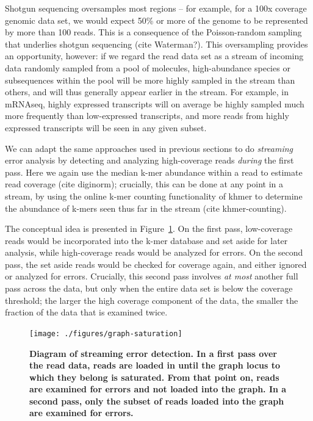 \documentclass{article}
\begin{document}
Shotgun sequencing oversamples most regions -- for example, for a 100x
coverage genomic data set, we would expect 50\% or more of the genome
to be represented by more than 100 reads.  This is a consequence of
the Poisson-random sampling that underlies shotgun sequencing (cite
Waterman?).  This oversampling provides an opportunity, however: if we
regard the read data set as a stream of incoming data randomly sampled
from a pool of molecules, high-abundance species or subsequences
within the pool will be more highly sampled in the stream than others,
and will thus generally appear earlier in the stream.  For example, in
mRNAseq, highly expressed transcripts will on average be highly
sampled much more frequently than low-expressed transcripts, and more
reads from highly expressed transcripts will be seen in any given
subset.

We can adapt the same approaches used in previous sections to do {\em
  streaming} error analysis by detecting and analyzing high-coverage
reads {\em during} the first pass.  Here we again use the median k-mer
abundance within a read to estimate read coverage (cite diginorm);
crucially, this can be done at any point in a stream, by using the
online k-mer counting functionality of khmer to determine the
abundance of k-mers seen thus far in the stream (cite khmer-counting).

The conceptual idea is presented in Figure~\ref{fig:concept}.  On the
first pass, low-coverage reads would be incorporated into the k-mer
database and set aside for later analysis, while high-coverage reads
would be analyzed for errors. On the second pass, the set aside reads
would be checked for coverage again, and either ignored or analyzed
for errors.  Crucially, this second pass involves {\em at most}
another full pass across the data, but only when the entire data set
is below the coverage threshold; the larger the high coverage
component of the data, the smaller the fraction of the data that is
examined twice.

\begin{figure}[!ht]
 \centerline{\texttt{[image: ./figures/graph-saturation]}}
\caption{\bf Diagram of streaming error detection. In a first pass
over the read data, reads are loaded in until the graph locus to which
they belong is saturated.  From that point on, reads are examined for
errors and not loaded into the graph.  In a second pass, only the subset
of reads loaded into the graph are examined for errors.}
\label{fig:concept}
\end{figure}
\end{document}
